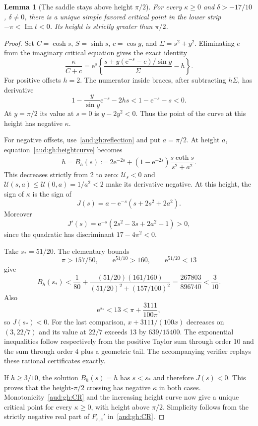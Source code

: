\documentclass[11pt,a4paper]{article}
\numberwithin{equation}{section}
\newtheorem{lemma}[theorem]{Lemma}
\begin{document}
\begin{lemma}[The saddle stays above height $\pi/2$]\label{aud:gh:height}
For every $\kappa\ge0$ and $\delta>-17/10$, $\delta\ne0$, there is a unique simple favored critical point in the lower strip $-\pi<\operatorname{Im}t<0$. Its height is strictly greater than $\pi/2$.
\end{lemma}
\begin{proof}
Set $C=\cosh s$, $S=\sinh s$, $c=\cos y$, and $\Sigma=s^2+y^2$. Eliminating $e$ from the imaginary critical equation gives the exact identity
\begin{equation}\label{aud:gh:elimination}
 \frac\kappa{C+c}
 =\mathrm e^s\left\{\frac{s+y(\mathrm e^{-s}-c)/\sin y}{\Sigma}-h\right\}.
\end{equation}
For positive offsets $h=2$. The numerator inside braces, after subtracting $h\Sigma$, has derivative
\[
 1-\frac y{\sin y}\mathrm e^{-s}-2hs<1-\mathrm e^{-s}-s<0.
\]
At $y=\pi/2$ its value at $s=0$ is $y-2y^2<0$. Thus the point of the curve at this height has negative $\kappa$.

For negative offsets, use~\eqref{aud:gh:reflection} and put $a=\pi/2$. At height $a$, equation~\eqref{aud:gh:heightcurve} becomes
\begin{equation}\label{aud:gh:B}
 h=B_h(s):=2\mathrm e^{-2s}+(1-\mathrm e^{-2s})\frac{s\coth s}{s^2+a^2}.
\end{equation}
This decreases strictly from 2 to zero: $\mathcal U_s<0$ and
$\mathcal U(s,a)\le \mathcal U(0,a)=1/a^2<2$ make its derivative negative. At this height, the sign of $\kappa$ is the sign of
\[
 J(s)=a-\mathrm e^{-s}(s+2s^2+2a^2).
\]
Moreover
\[
 J'(s)=\mathrm e^{-s}(2s^2-3s+2a^2-1)>0,
\]
since the quadratic has discriminant $17-4\pi^2<0$.

Take $s_*=51/20$. The elementary bounds
\[
 \pi>157/50,\qquad \mathrm e^{51/10}>160,\qquad \mathrm e^{51/20}<13
\]
give
\begin{equation}\label{aud:gh:heightcertificate}
 B_h(s_*)<\frac1{80}+
 \frac{(51/20)(161/160)}{(51/20)^2+(157/100)^2}
 =\frac{267803}{896740}<\frac3{10}.
\end{equation}
Also
\[
 \mathrm e^{s_*}<13<\pi+\frac{3111}{100\pi},
\]
so $J(s_*)<0$. For the last comparison, $x+3111/(100x)$ decreases on $(3,22/7)$ and its value at $22/7$ exceeds 13 by $639/15400$. The exponential inequalities follow respectively from the positive Taylor sum through order 10 and the sum through order 4 plus a geometric tail. The accompanying verifier replays these rational certificates exactly.

If $h\ge3/10$, the solution $B_h(s)=h$ has $s<s_*$ and therefore $J(s)<0$. This proves that the height-$\pi/2$ crossing has negative $\kappa$ in both cases. Monotonicity~\eqref{aud:gh:CR} and the increasing height curve now give a unique critical point for every $\kappa\ge0$, with height above $\pi/2$. Simplicity follows from the strictly negative real part of $F_{r,e}'$ in~\eqref{aud:gh:CR}.
\end{proof}
\end{document}
